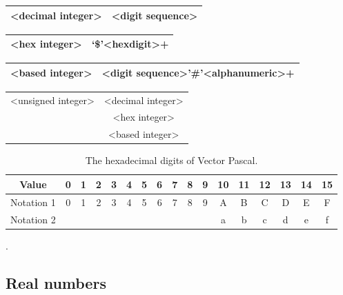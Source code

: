 \vspace{0.3cm}
{\centering \begin{tabular}{|c|c|}
\hline 
<decimal integer>&
<digit sequence>\\
\hline 
\end{tabular}\par}
\vspace{0.3cm}

\vspace{0.3cm}
{\centering \begin{tabular}{|c|c|}
\hline 
<hex integer>&
`\$'<hexdigit>+\\
\hline 
\end{tabular}\par}
\vspace{0.3cm}

\vspace{0.3cm}
{\centering \begin{tabular}{|c|c|}
\hline 
<based integer> &
<digit sequence>'\#'<alphanumeric>+\\
\hline 
\end{tabular}\par}
\vspace{0.3cm}

\vspace{0.3cm}
{\centering \begin{tabular}{|c|c|}
\hline 
<unsigned integer>&
<decimal integer>\\
&
<hex integer>\\
&
<based integer>\\
\hline 
\end{tabular}
\begin{table}

\caption{The hexadecimal digits of Vector Pascal.}
{\centering \begin{tabular}{|c|c|c|c|c|c|c|c|c|c|c|c|c|c|c|c|c|}
\hline 
Value&
0&
1&
2&
3&
4&
5&
6&
7&
8&
9&
10&
11&
12&
13&
14&
15\\
\hline 
Notation 1&
0&
1&
2&
3&
4&
5&
6&
7&
8&
9&
A&
B&
C&
D&
E&
F\\
\hline 
Notation 2&
&
&
&
&
&
&
&
&
&
&
a&
b&
c&
d&
e&
f\\
\hline 
\end{tabular}\par}
.
\end{table}
 \par}
\vspace{0.3cm}


\subsection{Real numbers}

